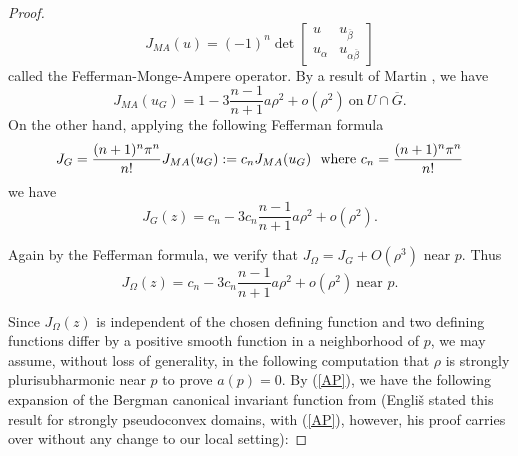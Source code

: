 \documentclass[a4paper,centertags,osxzneside,12pt]{amsart}
\numberwithin{equation}{section}
\begin{document}
\begin{proof}
\begin{equation}\label{MA}
J_{MA}(u)=(-1)^n\det\left[\begin{array}{cc}
     u & u_{\overline\beta}  \\
     u_{\alpha}&  u_{\alpha\overline\beta}
\end{array}\right]
\end{equation}
called  the Fefferman-Monge-Ampere operator. By a result of Martin \cite[Page 93]{Ma21}, 
we have
$$J_{MA}(u_{G})=1-3\frac{n-1}{n+1}a\rho^2+o(\rho^2)~\text{on} ~U\cap \overline G.$$
On the other hand, applying the following Fefferman formula \cite{Ma21} 
\begin{equation}\label{Fefferman formula}
    J_{G}=\frac{(n+1)^n\pi^n}{n!} J_{MA}(u_{G}):=c_n J_{MA}(u_{G}) \ \ \hbox{where  } c_n=\frac{(n+1)^n\pi^n}{n!}
\end{equation}
 we have
\begin{equation}
    J_G(z)=c_n-3c_n\frac{n-1}{n+1}a\rho^2+o(\rho^2).
\end{equation}
 
Again by the Fefferman formula, we verify that 
$J_\Omega=J_G+O(\rho^3)$ near $p$. Thus 
\begin{equation}
    J_{\Omega}(z)=c_n-3c_n\frac{n-1}{n+1}a\rho^2+o(\rho^2)~\text{near }p.
\end{equation}

Since $J_\Omega(z)$  is independent of the chosen defining function and two defining functions differ by a positive smooth function in a neighborhood of $p$, we may assume, without loss of generality,  in the following computation that $\rho$ is strongly plurisubharmonic near $p$ to prove $a(p) = 0$.
By (\ref{AP}), we have the following expansion of the Bergman canonical invariant function from \cite{Eng08} (Engliš stated this result for strongly pseudoconvex domains, with (\ref{AP}),  however, his proof carries over without any change to our local setting):


\end{proof}
\end{document}
